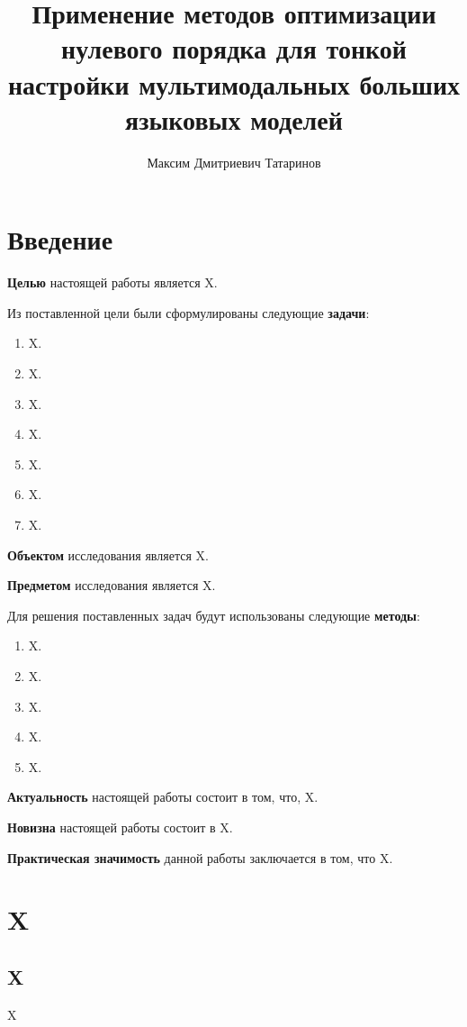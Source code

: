 \documentclass[LI,KR]{HSEUniversity}
\title{Применение методов оптимизации нулевого порядка для тонкой настройки мультимодальных больших языковых моделей}
\author{Максим Дмитриевич Татаринов}
\begin{document}
\maketitle

\chapter*{Введение}


\textbf{Целью} настоящей работы является X.

Из поставленной цели были сформулированы следующие \textbf{задачи}:
\begin{enumerate}
    \item  X.
    \item  X.
    \item  X.
    \item  X.
    \item  X.
    \item  X.
    \item  X.
\end{enumerate}

\textbf{Объектом} исследования является X.

\textbf{Предметом} исследования является X.

Для решения поставленных задач будут использованы следующие \textbf{методы}:
\begin{enumerate}
    \item  X.
    \item  X.
    \item  X.
    \item  X.
    \item  X.
\end{enumerate}

\textbf{Актуальность} настоящей работы состоит в том, что, X.

\textbf{Новизна} настоящей работы состоит в X.

\textbf{Практическая значимость} данной работы заключается в том, что X.


\chapter{X}

\section{X}

X

\putbibliography %
\end{document}
